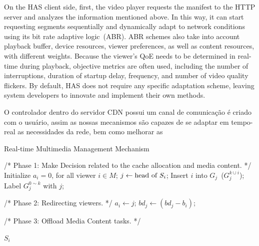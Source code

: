 On the HAS client side, first, the video player requests the manifest to the HTTP server and analyzes the information mentioned above. In this way, it can start requesting segments sequentially and dynamically adapt to network conditions using its bit rate adaptive logic~(ABR). ABR schemes also take into account playback buffer, device resources, viewer preferences, as well as content resources, with different weights.
Because the viewer's QoE needs to be determined in real-time during playback, objective metrics are often used, including the number of interruptions, duration of startup delay, frequency, and number of video quality flickers. By default, HAS does not require any specific adaptation scheme, leaving system developers to innovate and implement their own methods.

O controlador dentro do servidor CDN possui um canal de comunicação é criado com o usuário, assim as nossas mecanismos são capazes de se adaptar em tempo-real as necessidades da rede, bem como melhorar as

\begin{algorithm} \caption{Real-time Multimedia Management Mechanism}
\begin{algorithmic}[1]


\State /* Phase 1: Make Decision related to the cache allocation and media content. */
\State Initialize $a_i = 0$, for all viewer $i \in M$;
    \State $j \leftarrow \textup{head of } S_{i}$;
    \State Insert $i$ into $G_{j}$~($G_{j}^{k \cup i}$);
        \State Label $G_{j}^{0 \sim k}$ with $j$;
    \EndIf
\EndFor

\State /* Phase 2: Redirecting viewers. */
        \State $a_i \gets j$; $bd_j \gets (bd_j - b_i)$;
    \EndIf 
\EndFor

\State /* Phase 3: Offload Media Content tasks. */

\Ensure $S_i$
\end{algorithmic}
\end{algorithm}
